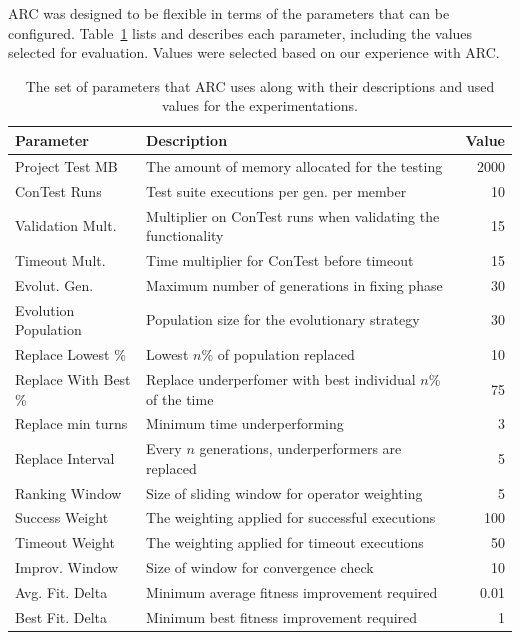 \documentclass{llncs}
\begin{document}
ARC was designed to be flexible in terms of the parameters that can be
configured. Table~\ref{tbl:used_parameters} lists and describes each parameter,
including the values selected for evaluation. Values were selected based on our
experience with ARC.


\begin{table}%
\caption{The set of parameters that ARC uses along with their descriptions and
used values for the experimentations.}
\begin{center}
\lstset{basicstyle=\scriptsize}
\begin{tabular}{|l|l|r|}
\hline
\textbf{Parameter} & \textbf{Description} & \textbf{Value}\\
\hline
Project Test MB & The amount of memory allocated for the testing & 2000\\
\hline
ConTest Runs & Test suite executions per gen. per member & 10\\
\hline
Validation Mult. & Multiplier on ConTest runs when validating the functionality & 15\\
\hline
Timeout Mult. & Time multiplier for ConTest before timeout & 15\\
\hline
Evolut. Gen. & Maximum number of generations in fixing phase & 30\\
\hline
Evolution Population & Population size for the evolutionary strategy & 30\\
\hline
Replace Lowest \% & Lowest $n$\% of population replaced & 10\\
\hline
Replace With Best \% & Replace underperfomer with best individual $n$\% of the time & 75\\
\hline
Replace min turns & Minimum time underperforming & 3\\
\hline
Replace Interval & Every $n$ generations, underperformers are replaced & 5\\
\hline
Ranking Window & Size of sliding window for operator weighting & 5\\
\hline
Success Weight & The weighting applied for successful executions & 100\\
\hline
Timeout Weight & The weighting applied for timeout executions & 50\\
\hline
Improv. Window & Size of window for convergence check & 10\\
\hline
Avg. Fit. Delta & Minimum average fitness improvement required & 0.01\\
\hline
Best Fit. Delta & Minimum best fitness improvement required & 1\\
\hline
\end{tabular}
\label{tbl:used_parameters}
\end{center}
\end{table}
\end{document}
